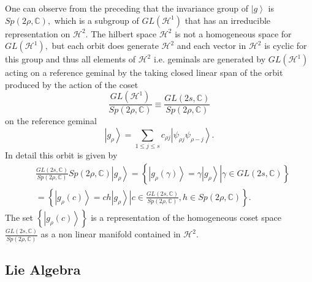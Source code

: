 \documentclass[aps,preprint]{revtex4}%
\begin{document}
One can observe from the preceding that the invariance group of $\left\vert
g\right\rangle $ is $Sp\left(  2\rho,\mathbb{C}\right)  ,$ which is a subgroup
of $GL\left(  \mathcal{H}^{1}\right)  $ that has an irreducible representation
on $\mathcal{H}^{2}.$ The hilbert space $\mathcal{H}^{2}$ is not a homogeneous
space for $GL\left(  \mathcal{H}^{1}\right)  ,$ but each orbit does generate
$\mathcal{H}^{2}$ and each vector in $\mathcal{H}^{2}$ is cyclic for this
group and thus all elements of $\mathcal{H}^{2}$ i.e. geminals are generated
by $GL\left(  \mathcal{H}^{1}\right)  $ acting on a reference geminal by the
taking closed linear span of the orbit produced by the action of the coset%
\begin{equation}
\frac{GL\left(  \mathcal{H}^{1}\right)  }{Sp\left(  2\rho,\mathbb{C}\right)
}\equiv\frac{GL\left(  2s,\mathbb{C}\right)  }{Sp\left(  2\rho,\mathbb{C}%
\right)  }%
\end{equation}
on the reference geminal
\begin{equation}
\left\vert g_{\rho}\right\rangle =\sum_{1\leq j\leq s}c_{\rho j}\left\vert
\psi_{\rho j}\psi_{\rho-j}\right\rangle .
\end{equation}
In detail this orbit is given by
\begin{align}
&  \frac{GL\left(  2s,\mathbb{C}\right)  }{Sp\left(  2\rho,\mathbb{C}\right)
}Sp\left(  2\rho,\mathbb{C}\right)  \left\vert g_{\rho}\right\rangle =\left\{
\left.  \left\vert g_{\rho}\left(  \gamma\right)  \right\rangle =\gamma
\left\vert g_{\rho}\right\rangle \right\vert \gamma\in GL\left(
2s,\mathbb{C}\right)  \right\} \nonumber\\
&  =\left\{  \left\vert g_{\rho}\left(  c\right)  \right\rangle =ch\left\vert
g_{\rho}\right\rangle \left\vert c\in\frac{GL\left(  2s,\mathbb{C}\right)
}{Sp\left(  2\rho,\mathbb{C}\right)  },h\in Sp\left(  2\rho,\mathbb{C}\right)
\right.  \right\}  .
\end{align}
The set $\left\{  \left\vert g_{\rho}\left(  c\right)  \right\rangle \right\}
$ is a representation of the homogeneous coset space $\frac{GL\left(
2s,\mathbb{C}\right)  }{Sp\left(  2\rho,\mathbb{C}\right)  }$ as a non linear
manifold contained in $\mathcal{H}^{2}.$

\subsection{Lie Algebra}
\end{document}
